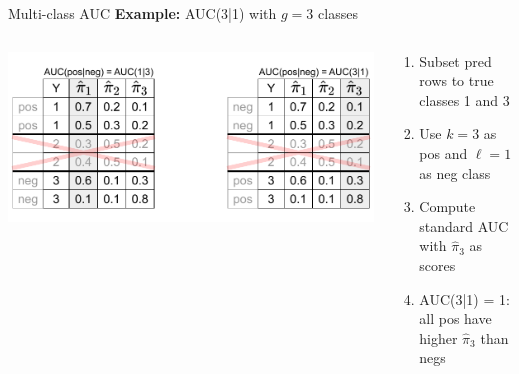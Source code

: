 \documentclass[11pt,compress,t,notes=noshow, xcolor=table]{beamer}
\begin{document}
\begin{vbframe}{Multi-class AUC}
\textbf{Example:} AUC(3|1) with $g=3$ classes 
\begin{columns}[T]
\begin{column}{0.3\textwidth}
\centerline{\includegraphics[trim = 250 15 00 10, clip, width=\textwidth]{figure_man/multiclass-auc.pdf}}
\end{column}
\begin{column}{0.7\textwidth}
    \lz
\begin{enumerate}
\item Subset pred rows to true classes 1 and 3
\item Use $k=3$ as pos and $\ell = 1$ as neg class
\item Compute standard AUC with $\hat{\pi}_3$ as scores\\ %
\item AUC(3|1) = 1:\\ all pos have higher $\hat{\pi}_3$ than negs
\end{enumerate}
\end{column}
\end{columns}

\end{vbframe}

\end{document}

